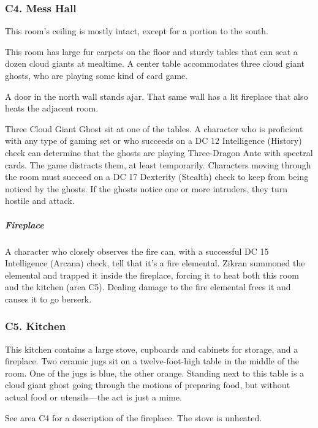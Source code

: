 \documentclass[10pt,a4paper,twoside,bg=print,twocolumn,openany,nodeprecatedcode]{dndbook}
\begin{document}
\subsubsection{C4. Mess Hall}
This room's ceiling is mostly intact, except for a portion to the south.

\begin{DndReadAloud}{}
This room has large fur carpets on the floor and sturdy tables that can seat a dozen cloud giants at mealtime. A center table accommodates three cloud giant ghosts, who are playing some kind of card game.

A door in the north wall stands ajar. That same wall has a lit fireplace that also heats the adjacent room.

\end{DndReadAloud}

Three Cloud Giant Ghost sit at one of the tables. A character who is proficient with any type of gaming set or who succeeds on a DC 12 Intelligence (History) check can determine that the ghosts are playing Three-Dragon Ante with spectral cards. The game distracts them, at least temporarily. Characters moving through the room must succeed on a DC 17 Dexterity (Stealth) check to keep from being noticed by the ghosts. If the ghosts notice one or more intruders, they turn hostile and attack.

\subparagraph{Fireplace}
A character who closely observes the fire can, with a successful DC 15 Intelligence (Arcana) check, tell that it's a fire elemental. Zikran summoned the elemental and trapped it inside the fireplace, forcing it to heat both this room and the kitchen (area C5). Dealing damage to the fire elemental frees it and causes it to go berserk.

\subsubsection{C5. Kitchen}
\begin{DndReadAloud}{}
This kitchen contains a large stove, cupboards and cabinets for storage, and a fireplace. Two ceramic jugs sit on a twelve-foot-high table in the middle of the room. One of the jugs is blue, the other orange. Standing next to this table is a cloud giant ghost going through the motions of preparing food, but without actual food or utensils—the act is just a mime.

\end{DndReadAloud}

See area C4 for a description of the fireplace. The stove is unheated.
\end{document}
